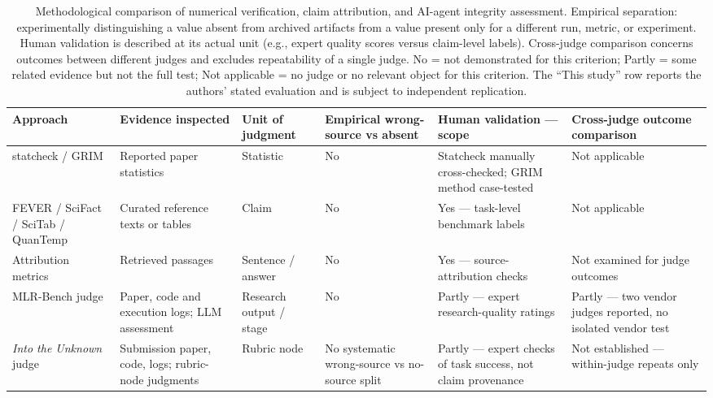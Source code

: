 \documentclass[preprint,12pt,authoryear]{elsarticle}
\begin{document}
\begin{table}
\centering
\caption{Methodological comparison of numerical verification, claim attribution, and AI-agent integrity assessment. Empirical separation: experimentally distinguishing a value absent from archived artifacts from a value present only for a different run, metric, or experiment. Human validation is described at its actual unit (e.g., expert quality scores versus claim-level labels). Cross-judge comparison concerns outcomes between different judges and excludes repeatability of a single judge. No = not demonstrated for this criterion; Partly = some related evidence but not the full test; Not applicable = no judge or no relevant object for this criterion. The ``This study'' row reports the authors' stated evaluation and is subject to independent replication.}
\label{tab:positioning}
\scriptsize
\setlength{\tabcolsep}{3pt}
\begin{tabular}{@{}>{\raggedright\arraybackslash}p{4.2cm}>{\raggedright\arraybackslash}p{2.9cm}>{\raggedright\arraybackslash}p{1.7cm}>{\raggedright\arraybackslash}p{2.7cm}>{\raggedright\arraybackslash}p{3.3cm}>{\raggedright\arraybackslash}p{3.1cm}@{}}
\toprule
Approach & Evidence inspected & Unit of judgment & Empirical wrong-source vs absent & Human validation --- scope & Cross-judge outcome comparison\\
\midrule
statcheck / GRIM \citep{nuijten2016statcheck,brown2017grim} & Reported paper statistics & Statistic & No & Statcheck manually cross-checked; GRIM method case-tested & Not applicable\\
FEVER \citep{thorne2018fever} / SciFact \citep{wadden2020scifact} / SciTab \citep{lu2023scitab} / QuanTemp \citep{venktesh2024quantemp} & Curated reference texts or tables & Claim & No & Yes --- task-level benchmark labels & Not applicable\\
Attribution metrics \citep{rashkin2023ais,gao2023alce,liu2023verifiability} & Retrieved passages & Sentence / answer & No & Yes --- source-attribution checks & Not examined for judge outcomes\\
MLR-Bench judge \citep{chen2025mlrbench} & Paper, code and execution logs; LLM assessment & Research output / stage & No & Partly --- expert research-quality ratings & Partly --- two vendor judges reported, no isolated vendor test\\
\emph{Into the Unknown} judge \citep{kim2026unknown} & Submission paper, code, logs; rubric-node judgments & Rubric node & No systematic wrong-source vs no-source split & Partly --- expert checks of task success, not claim provenance & Not established --- within-judge repeats only\\

\end{tabular}
\end{table}
\end{document}
